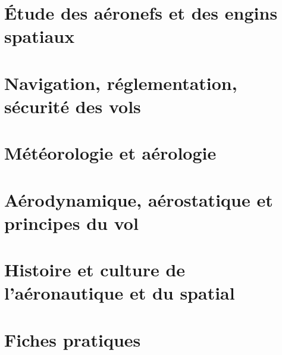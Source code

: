 \documentclass[a4paper,12pt,oneside]{report} %
\begin{document}
	\chapter{Étude des aéronefs et des engins spatiaux}
	\label{aeronef}
		
		
		
		
		
	
	\chapter{Navigation, réglementation, sécurité des vols\label{nav}}
		
		
		
	
	\chapter{Météorologie et aérologie}
	\label{meteo}
		
		
		
		
		
	
	\chapter{Aérodynamique, aérostatique et principes du vol}
	\label{aerodynamique}
		
		
		
		
	
	\chapter{Histoire et culture de l'aéronautique et du spatial}
	\label{histoire}
		
		
		
		
		
	\appendix
	\chapter{Fiches pratiques}
	
	
\end{document}

